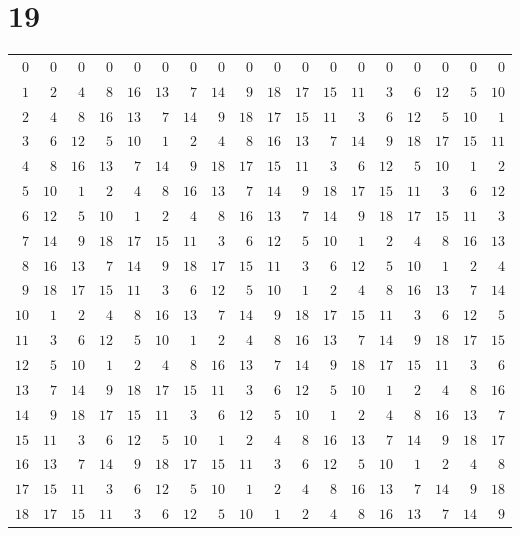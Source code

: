 \documentclass[a4paper]{scrartcl}
\begin{document}
\section*{19}
\begin{tabular}{rrrrrrrrrrrrrrrrrr}
\toprule
$0$ & $0$ & $0$ & $0$ & $0$ & $0$ & $0$ & $0$ & $0$ & $0$ & $0$ & $0$ & $0$ & $0$ & $0$ & $0$ & $0$ & $0$ \\
$1$ & $2$ & $4$ & $8$ & $16$ & $13$ & $7$ & $14$ & $9$ & $18$ & $17$ & $15$ & $11$ & $3$ & $6$ & $12$ & $5$ & $10$ \\
$2$ & $4$ & $8$ & $16$ & $13$ & $7$ & $14$ & $9$ & $18$ & $17$ & $15$ & $11$ & $3$ & $6$ & $12$ & $5$ & $10$ & $1$ \\
$3$ & $6$ & $12$ & $5$ & $10$ & $1$ & $2$ & $4$ & $8$ & $16$ & $13$ & $7$ & $14$ & $9$ & $18$ & $17$ & $15$ & $11$ \\
$4$ & $8$ & $16$ & $13$ & $7$ & $14$ & $9$ & $18$ & $17$ & $15$ & $11$ & $3$ & $6$ & $12$ & $5$ & $10$ & $1$ & $2$ \\
$5$ & $10$ & $1$ & $2$ & $4$ & $8$ & $16$ & $13$ & $7$ & $14$ & $9$ & $18$ & $17$ & $15$ & $11$ & $3$ & $6$ & $12$ \\
$6$ & $12$ & $5$ & $10$ & $1$ & $2$ & $4$ & $8$ & $16$ & $13$ & $7$ & $14$ & $9$ & $18$ & $17$ & $15$ & $11$ & $3$ \\
$7$ & $14$ & $9$ & $18$ & $17$ & $15$ & $11$ & $3$ & $6$ & $12$ & $5$ & $10$ & $1$ & $2$ & $4$ & $8$ & $16$ & $13$ \\
$8$ & $16$ & $13$ & $7$ & $14$ & $9$ & $18$ & $17$ & $15$ & $11$ & $3$ & $6$ & $12$ & $5$ & $10$ & $1$ & $2$ & $4$ \\
$9$ & $18$ & $17$ & $15$ & $11$ & $3$ & $6$ & $12$ & $5$ & $10$ & $1$ & $2$ & $4$ & $8$ & $16$ & $13$ & $7$ & $14$ \\
$10$ & $1$ & $2$ & $4$ & $8$ & $16$ & $13$ & $7$ & $14$ & $9$ & $18$ & $17$ & $15$ & $11$ & $3$ & $6$ & $12$ & $5$ \\
$11$ & $3$ & $6$ & $12$ & $5$ & $10$ & $1$ & $2$ & $4$ & $8$ & $16$ & $13$ & $7$ & $14$ & $9$ & $18$ & $17$ & $15$ \\
$12$ & $5$ & $10$ & $1$ & $2$ & $4$ & $8$ & $16$ & $13$ & $7$ & $14$ & $9$ & $18$ & $17$ & $15$ & $11$ & $3$ & $6$ \\
$13$ & $7$ & $14$ & $9$ & $18$ & $17$ & $15$ & $11$ & $3$ & $6$ & $12$ & $5$ & $10$ & $1$ & $2$ & $4$ & $8$ & $16$ \\
$14$ & $9$ & $18$ & $17$ & $15$ & $11$ & $3$ & $6$ & $12$ & $5$ & $10$ & $1$ & $2$ & $4$ & $8$ & $16$ & $13$ & $7$ \\
$15$ & $11$ & $3$ & $6$ & $12$ & $5$ & $10$ & $1$ & $2$ & $4$ & $8$ & $16$ & $13$ & $7$ & $14$ & $9$ & $18$ & $17$ \\
$16$ & $13$ & $7$ & $14$ & $9$ & $18$ & $17$ & $15$ & $11$ & $3$ & $6$ & $12$ & $5$ & $10$ & $1$ & $2$ & $4$ & $8$ \\
$17$ & $15$ & $11$ & $3$ & $6$ & $12$ & $5$ & $10$ & $1$ & $2$ & $4$ & $8$ & $16$ & $13$ & $7$ & $14$ & $9$ & $18$ \\
$18$ & $17$ & $15$ & $11$ & $3$ & $6$ & $12$ & $5$ & $10$ & $1$ & $2$ & $4$ & $8$ & $16$ & $13$ & $7$ & $14$ & $9$ \\
\bottomrule
\end{tabular}
\end{document}
